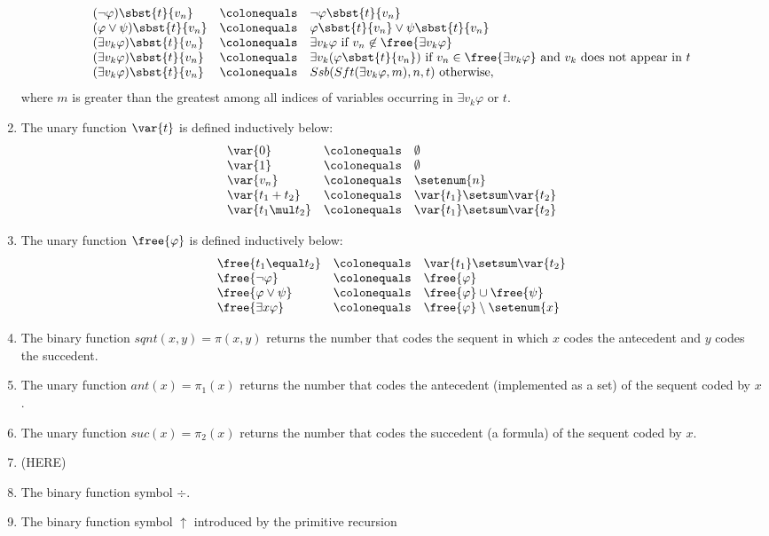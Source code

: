 \begin{enumerate}[1.]
\[\begin{array}{lll}
(\neg\varphi)\sbst{t}{v_n} & \colonequals & \neg\varphi\sbst{t}{v_n} \cr
(\varphi \lor \psi)\sbst{t}{v_n} & \colonequals & \varphi\sbst{t}{v_n} \lor \psi\sbst{t}{v_n} \cr
(\exists v_k \varphi)\sbst{t}{v_n} & \colonequals & \exists v_k \varphi \ \mbox{if \(v_n \not\in \free{\exists v_k \varphi}\)} \cr
(\exists v_k \varphi)\sbst{t}{v_n} & \colonequals & \exists v_k (\varphi\sbst{t}{v_n}) \ \mbox{if \(v_n \in \free{\exists v_k \varphi}\) and \(v_k\) does not appear in \(t\)} \cr
(\exists v_k \varphi)\sbst{t}{v_n} & \colonequals & Ssb(Sft(\exists v_k \varphi, m), n, t) \ \mbox{otherwise},
\end{array}
\]
where $m$ is greater than the greatest among all indices of variables occurring in $\exists v_k \varphi$ or $t$.
%
\item The unary function $\var{t}$ is defined inductively below:
\[
\begin{array}{lll}
\var{0} & \colonequals & \emptyset \cr
\var{1} & \colonequals & \emptyset \cr
\var{v_n} & \colonequals & \setenum{n} \cr
\var{t_1 + t_2} & \colonequals & \var{t_1} \setsum \var{t_2} \cr
\var{t_1 \mul t_2} & \colonequals & \var{t_1} \setsum \var{t_2}
\end{array}
\]
%
\item The unary function $\free{\varphi}$ is defined inductively below:
\[
\begin{array}{lll}
\free{t_1 \equal t_2} & \colonequals & \var{t_1} \setsum \var{t_2} \cr
\free{\neg\varphi} & \colonequals & \free{\varphi} \cr
\free{\varphi \lor \psi} & \colonequals & \free{\varphi} \cup \free{\psi} \cr
\free{\exists x \varphi} & \colonequals & \free{\varphi} \setminus \setenum{x}
\end{array}
\]
%
\item The binary function $sqnt(x, y) = \pi(x, y)$ returns the number that codes the sequent in which $x$ codes the antecedent and $y$ codes the succedent.
%
\item The unary function $ant(x) = \pi_1(x)$ returns the number that codes the antecedent (implemented as a set) of the sequent coded by $x$.
%
\item The unary function $suc(x) = \pi_2(x)$ returns the number that codes the succedent (a formula) of the sequent coded by $x$.
%
\item (HERE)
%
\item The binary function symbol $\div$.
%
\item The binary function symbol $\uparrow$ introduced by the primitive recursion
\[
\begin{array}{lll}

\end{array}\]
\end{enumerate}
